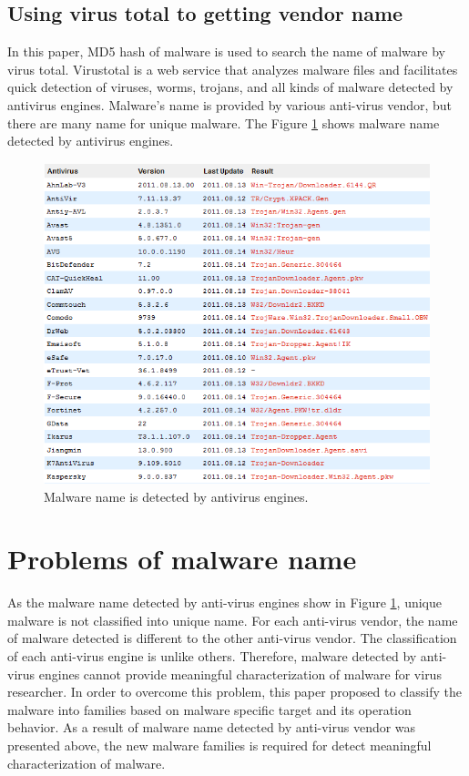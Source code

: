 \subsection{Using virus total to getting vendor name}
In this paper, MD5 hash of malware is used to search the name of malware by virus total. Virustotal is a web service that analyzes malware files and facilitates quick detection of viruses, worms, trojans, and all kinds of malware detected by antivirus engines. Malware's name is provided by various anti-virus vendor, but there are many name for unique malware. The Figure \ref{fig:virustotal_listname} shows malware name detected by antivirus engines. 
\begin{figure}[h!]
\centering
\includegraphics[width=1.0\textwidth]{graph/virustotal_listname.png}
\caption{Malware name is detected by antivirus engines.}
\label{fig:virustotal_listname}
\end{figure}
\section{Problems of malware name} 
As the malware name detected by anti-virus engines show in Figure \ref{fig:virustotal_listname}, unique malware is not classified into unique name. For each anti-virus vendor, the name of malware detected is different to the other anti-virus vendor. The classification of each anti-virus engine is unlike others. Therefore, malware detected by anti-virus engines cannot provide meaningful characterization of malware for virus researcher. In order to overcome this problem, this paper proposed to classify the malware into families based on malware specific target and its operation behavior. 
As a result of malware name detected by anti-virus vendor was presented above, the new malware families is required for detect meaningful characterization of malware. 
